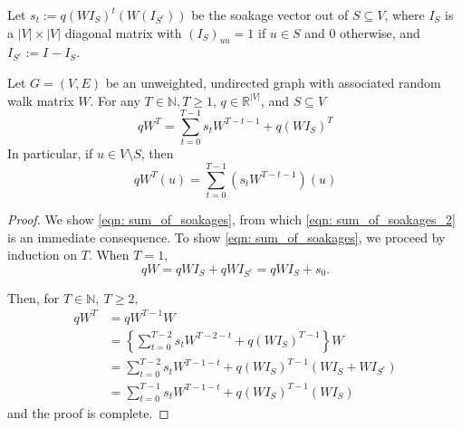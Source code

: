 \documentclass[11pt,twoside]{article}
\newcommand{\abs}[1]{\left \lvert #1 \right \rvert}
\newcommand{\Reals}{\mathbb{R}}
\newcommand{\1}{\mathbbm{1}}
\newcommand{\Wbf}{W}
\newcommand{\Ibf}[1]{I_{#1}}
\begin{document}
Let $s_t := q(\Wbf \Ibf{S})^t(\Wbf(\Ibf{S^c}))$ be the soakage vector out of $S \subseteq V$, where $\Ibf{S}$ is a $\abs{V} \times \abs{V}$ diagonal matrix with $(\Ibf{S})_{uu} = 1$ if $u \in S$ and 0 otherwise, and $\Ibf{S^c} := \Ibf{} - \Ibf{S}$. 
\begin{lemma}
	\label{lem: sum_of_soakages}
	Let $G = (V,E)$ be an unweighted, undirected graph with associated random walk matrix $\Wbf$. For any $T \in \mathbb{N}, T \geq 1$, $q \in \Reals^{\abs{V}}$, and $S \subseteq V$
	\begin{equation}
	\label{eqn: sum_of_soakages}
	q\Wbf^T = \sum_{t = 0}^{T - 1} s_t \Wbf^{T - t - 1} + q(\Wbf \Ibf{S})^T
	\end{equation}
	In particular, if $u \in V\setminus S$, then
	\begin{equation}
	\label{eqn: sum_of_soakages_2}
	q\Wbf^T(u) = \sum_{t = 0}^{T - 1} \left(s_t \Wbf^{T - t - 1}\right)(u)
	\end{equation}
\end{lemma}
\begin{proof}	
	We show \eqref{eqn: sum_of_soakages}, from which \eqref{eqn: sum_of_soakages_2} is an immediate consequence.
	To show \eqref{eqn: sum_of_soakages}, we proceed by induction on $T$. When $T = 1$,
	\begin{equation*}
	q\Wbf = q\Wbf\Ibf{S} + q\Wbf\Ibf{S^c} =  q\Wbf\Ibf{S} + s_0. 
	\end{equation*}
	
	Then, for $T \in \mathbb{N},~ T \geq 2$,
	\begin{align*}
	q\Wbf^{T} & = q\Wbf^{T - 1}{\Wbf} \\
	& = \left\{\sum_{t = 0}^{T - 2} s_t \Wbf^{T - 2 - t} + q(\Wbf \Ibf{S})^{T - 1} \right\} \Wbf \tag{by the inductive hypothesis}\\
	& = \sum_{t = 0}^{T - 2} s_t \Wbf^{T - 1 - t} + q(\Wbf \Ibf{S})^{T - 1} (\Wbf \Ibf{S} + \Wbf \Ibf{S^c}) \\
	& = \sum_{t = 0}^{T - 1} s_t \Wbf^{T - 1 - t} + q(\Wbf \Ibf{S})^{T - 1} (\Wbf \Ibf{S})
	\end{align*}
	and the proof is complete.
\end{proof}
\end{document}
